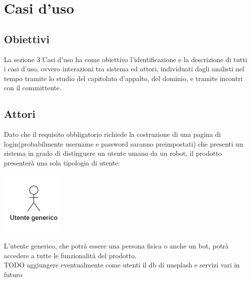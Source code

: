 \section{Casi d'uso}

\subsection{Obiettivi}
La sezione 3 Casi d'uso ha come obiettivo l'identificazione e la descrizione di tutti i casi d'uso, ovvero interazioni tra sistema ed attori, individuati dagli analisti nel tempo tramite lo studio del capitolato d'appalto, del dominio, e tramite incontri con il committente.

\subsection{Attori}
Dato che il requisito obbligatorio richiede la costruzione di una pagina di login(probabilmente username e password saranno preimpostati) che presenti un sistema in grado di distinguere un utente umano da un robot, il prodotto presenterà una sola tipologia di utente:\\
\begin{center}
\includegraphics[scale = 1]{img/utente_generico.png}\\
\end{center}
L'utente generico, che potrà essere una persona fisica o anche un bot, potrà accedere a tutte le funzionalità del prodotto. \\
TODO aggiungere eventualmente come utenti il db di unsplash e servizi vari in futuro

